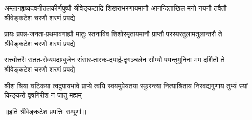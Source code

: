 \begin{AutoCols}[\maxColumns]
\fourlineindentedshloka
{अम्लानहृष्यदवनीतलकीर्णपुष्पौ}
{श्रीवेङ्कटाद्रि-शिखराभरणायमानौ}
{आनन्दिताखिल-मनो-नयनौ तवैतौ}
{श्रीवेङ्कटेश चरणौ शरणं प्रपद्ये}

\fourlineindentedshloka
{प्रायः प्रपन्न-जनता-प्रथमावगाह्यौ}
{मातुः स्तनाविव शिशोरमृतायमानौ}
{प्राप्तौ परस्परतुलामतुलान्तरौ ते}
{श्रीवेङ्कटेश चरणौ शरणं प्रपद्ये}

\fourlineindentedshloka
{सत्त्वोत्तरैः सतत-सेव्यपदाम्बुजेन}
{संसार-तारक-दयार्द्र-दृगञ्चलेन}
{सौम्यौ पयन्तृमुनिना मम दर्शितौ ते}
{श्रीवेङ्कटेश चरणौ शरणं प्रपद्ये}

\fourlineindentedshloka
{श्रीश श्रिया घटिकया त्वदुपायभावे}
{प्राप्ये त्वयि स्वयमुपेयतया स्फुरन्त्या}
{नित्याश्रिताय निरवद्यगुणाय तुभ्यं}
{स्यां किङ्करो वृषगिरीश न जातु मह्यम्}

॥इति श्रीवेङ्कटेश प्रपत्तिः सम्पूर्णा॥

\end{AutoCols}

